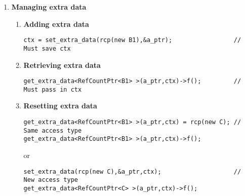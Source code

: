 \begin{enumerate}
\item {\bf Managing extra data}
%
\begin{enumerate}
%
\item {\bf Adding extra data}
%
{\small\begin{verbatim}
ctx = set_extra_data(rcp(new B1),&a_ptr);                 // Must save ctx
\end{verbatim}}
%
\item {\bf Retrieving extra data}
%
{\small\begin{verbatim}
get_extra_data<RefCountPtr<B1> >(a_ptr,ctx)->f();         // Must pass in ctx
\end{verbatim}}
%
\item {\bf Resetting extra data}
%
{\small\begin{verbatim}
get_extra_data<RefCountPtr<B1> >(a_ptr,ctx) = rcp(new C); // Same access type
get_extra_data<RefCountPtr<B1> >(a_ptr,ctx)->f();
\end{verbatim}}
or
{\small\begin{verbatim}
set_extra_data(rcp(new C),&a_ptr,ctx);                    // New access type
get_extra_data<RefCountPtr<C> >(a_ptr,ctx)->f();
\end{verbatim}}
%
\end{enumerate}

\end{enumerate}
